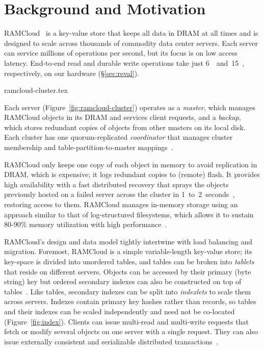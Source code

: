\section{Background and Motivation}
\label{sec:rmotivation}

RAMCloud~\cite{ramcloud} is a key-value store that keeps all data in
DRAM at all times and is designed to scale across thousands of commodity data
center servers. Each server can service millions of operations per
second, but its focus is on low access latency.  End-to-end read and durable
write operations take just 6~\us~and~15~\us,
respectively, on our hardware (\S\ref{sec:reval}).

 {ramcloud-cluster.tex}

Each server (Figure~\ref{fig:ramcloud-cluster}) operates as a \emph{master},
which manages RAMCloud objects in its DRAM and services client requests, and a
\emph{backup}, which stores redundant copies of objects from other masters on
its local disk.  Each cluster has one quorum-replicated \emph{coordinator} that
manages cluster membership and table-partition-to-master mappings~\cite{ongaro:raft}.

RAMCloud only keeps one copy of each object in memory to avoid replication in
DRAM, which is expensive; it logs redundant copies to (remote) flash.  It provides
high availability with a fast distributed recovery that sprays the objects 
previously hosted on
a failed server across the cluster in
1~to~2~seconds~\cite{ramcloud-recovery}, restoring access to them.
RAMCloud manages
in-memory storage using an approach similar to that of log-structured
filesystems, which allows it to sustain 80-90\% memory utilization
with high performance~\cite{ramcloud-lsm}.

RAMCloud's design and data model tightly intertwine with load balancing and migration.
Foremost, RAMCloud is a simple variable-length key-value store; its key-space
is divided into unordered tables, and tables can be broken into {\em tablets}
that reside on different servers.  Objects can be accessed by their primary (byte
string) key but ordered secondary indexes can also be constructed on top of
tables~\cite{ramcloud-slik}. Like tables, secondary indexes can be split into
{\em indexlets} to scale them across servers. Indexes contain primary key hashes
rather than records, so tables and their indexes can be scaled independently
and need not be co-located (Figure~\ref{fig:index}). Clients can issue multi-read
and multi-write requests that fetch or modify several objects on one server with
a single request. They can also issue externally consistent and serializable
distributed transactions~\cite{ramcloud-rifl}.

